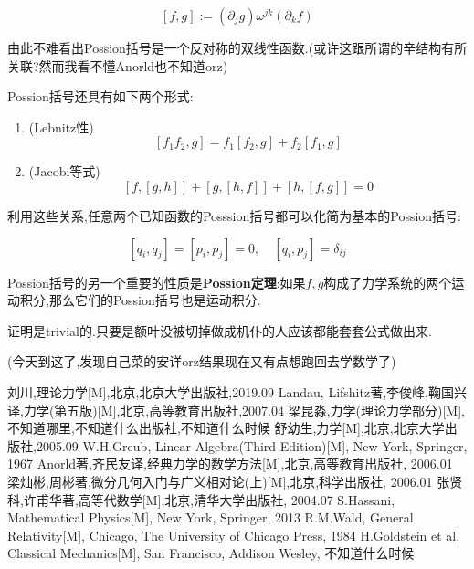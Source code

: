 \documentclass[UTF8]{article}
\begin{document}
	\[[f,g] := (\partial_{j} g) \omega^{jk} (\partial_{k} f)\]
	
	由此不难看出Possion括号是一个反对称的双线性函数.(或许这跟所谓的辛结构有所关联?然而我看不懂Anorld也不知道orz)
	
	Possion括号还具有如下两个形式:
	
	\begin{enumerate}
		
		\item (Lebnitz性) \[[f_{1}f_{2},g] = f_{1}[f_{2},g]+f_{2}[f_{1},g]\]
		
		\item (Jacobi等式) \[[f,[g,h]] + [g,[h,f]] + [h,[f,g]] = 0\]
		
	\end{enumerate}
	
	利用这些关系,任意两个已知函数的Posssion括号都可以化简为基本的Possion括号:
	
	\[[q_{i},q_{j}] = [p_{i},p_{j}] = 0,\quad [q_{i},p_{j}] = \delta_{ij}\]
	
	Possion括号的另一个重要的性质是\textbf{Possion定理}:如果$f,g$构成了力学系统的两个运动积分,那么它们的Possion括号也是运动积分.
	
	证明是trivial的.只要是额叶没被切掉做成机仆的人应该都能套套公式做出来.
	
	(今天到这了,发现自己菜的安详orz结果现在又有点想跑回去学数学了)

	
	
	
	
	
	
	



	
	
	
	
	
	
	\newpage
	
	\begin{thebibliography}{?}
		 刘川,理论力学[M],北京,北京大学出版社,2019.09
		 Landau, Lifshitz著,李俊峰,鞠国兴译,力学(第五版)[M],北京,高等教育出版社,2007.04
		 梁昆淼,力学(理论力学部分)[M],不知道哪里,不知道什么出版社,不知道什么时候
		 舒幼生,力学[M],北京,北京大学出版社,2005.09
		 W.H.Greub, Linear Algebra(Third Edition)[M], New York, Springer, 1967
		 Anorld著,齐民友译,经典力学的数学方法[M],北京,高等教育出版社, 2006.01
		 梁灿彬,周彬著,微分几何入门与广义相对论(上)[M],北京,科学出版社, 2006.01
		 张贤科,许甫华著,高等代数学[M],北京,清华大学出版社, 2004.07
		 S.Hassani, Mathematical Physics[M], New York, Springer, 2013
		 R.M.Wald, General Relativity[M], Chicago, The University of Chicago Press, 1984
		 H.Goldstein et al, Classical Mechanics[M], San Francisco, Addison Wesley, 不知道什么时候
	\end{thebibliography}
	
	
	
	
	
	
\end{document}
